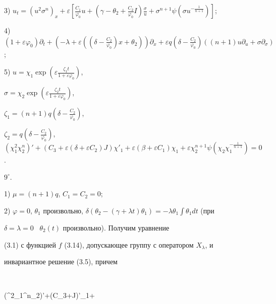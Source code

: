3) $u_t=(u^2\sigma^n)_x+\varepsilon[\frac{C_1}{\varphi_0}u+ 


(\gamma-\theta_2+\frac{C_2}{\varphi_0}I)\frac{\sigma}{u}+ 


\sigma^{n+1}\psi(\sigma u^{-\frac{1}{n+1}})]$; 


 


4) $(1+\varepsilon\varphi_0)\partial_t+(-\lambda+\varepsilon 


((\delta-\frac{C_2}{\varphi_0})x+\theta_2))\partial_x+ \varepsilon 


q(\delta-\frac{C_2}{\varphi_0})((n+1)u\partial_u 


+\sigma\partial_\sigma)$; 


 


5) $u=\chi_1\exp(\varepsilon\frac{\zeta_1t}{1+\varepsilon\varphi_0})$, 


$\sigma=\chi_2\exp(\varepsilon\frac{\zeta_2t}{1+\varepsilon\varphi_0})$, 


$\zeta_1=(n+1)q(\delta-\frac{C_2}{\varphi_0})$, 


$\zeta_2=q(\delta-\frac{C_2}{\varphi_0})$, $(\chi^2_1\chi^n_2)'+ 


(C_3+\varepsilon(\delta+\varepsilon C_2)J)\chi'_1+ 


\varepsilon(\beta+\varepsilon C_1)\chi_1+ \varepsilon\chi^{n+1}_2 


\psi(\chi_2\chi_1^{-\frac{1}{n+1}})=0$. 


 


\noindent{}$9^\circ$. 


 


1) $\mu=(n+1)q$, $C_1=C_2=0$; 


 


2) $\varphi=0$, $\theta_1$ произвольно, $\delta(\theta_2-(\gamma+ 


\lambda t)\theta_1)=-\lambda\theta_1\displaystyle\int\theta_1dt$ (при 


$\delta=\lambda=0$ \ $\theta_2(t)$ произвольно). Получим уравнение 


(3.1) с функцией $f$ (3.14), допускающее группу с оператором $X_\lambda$, и 


инвариантное решение (3.5), причем 


$$ 


(\chi^2_1\chi^n_2)'+(C_3+\varepsilon\delta J)\chi'_1+ 



